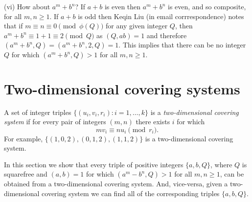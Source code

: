 \documentclass[12pt, a4paper,  reqno, english]{amsart}%
\numberwithin{equation}{section}
\theoremstyle{definition}
\renewcommand{\geq}{\geqslant}
\begin{document}
   (vi) How about $a^m+b^n$?  If $a+b$ is even then $a^m+b^n$ is even, and so composite,  for all $m,n\geq 1$.
If $a+b$ is odd then Keqin Liu (in email corrrespondence) notes that  if  $m\equiv n\equiv 0 \pmod {\phi(Q)}$ for any given integer $Q$, then  $a^m+b^n\equiv 1+1\equiv 2 \pmod Q$ as $(Q,ab)=1$ and therefore $(a^m+b^n,Q)=(a^m+b^n,2,Q)=1$. This implies that there can be no integer $Q$ for which  $(a^m+b^n,Q)>1$ for all $m,n\geq 1$.


 
 \section{Two-dimensional covering systems}
 
 
 A set of integer triples $\{ (u_i,v_i,r_i): i=1,\dots,k\}$ is a \emph{two-dimensional covering system} if for every pair of integers $(m,n)$ there exists $i$ for which
 \[
 mv_i\equiv nu_i \pmod {r_i}.
 \]
 For example, $\{(1,0,2), (0,1,2), (1,1,2)\}$ is a two-dimensional covering system.
 
  In this section we show that every   triple of positive integers $\{a,b,Q\}$, where $Q$ is squarefree and $(a,b)=1$ for which
$ (a^m-b^n , Q)>1$ for all $m,n\geq 1$, can be obtained from a two-dimensional covering system. And, vice-versa, given a two-dimensional covering system we can find all of the corresponding triples $\{a,b,Q\}$.

 
\end{document}

